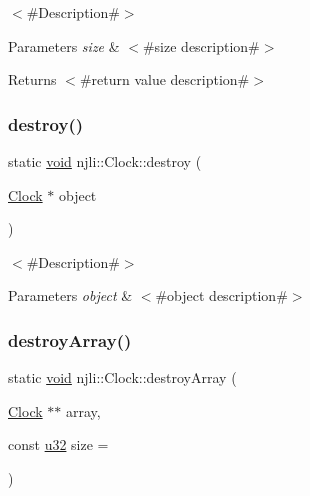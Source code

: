 $<$\#\+Description\#$>$


\begin{DoxyParams}{Parameters}
{\em size} & $<$\#size description\#$>$\\
\hline
\end{DoxyParams}
\begin{DoxyReturn}{Returns}
$<$\#return value description\#$>$ 
\end{DoxyReturn}
\mbox{\label{classnjli_1_1_clock_a4147bdb4d31e3402ba76ccd9652c50e0}} 
\subsubsection{\texorpdfstring{destroy()}{destroy()}}
{\footnotesize\ttfamily static \mbox{\hyperlink{_thread_8h_af1e856da2e658414cb2456cb6f7ebc66}{void}} njli\+::\+Clock\+::destroy (\begin{DoxyParamCaption}\item[{\mbox{\hyperlink{classnjli_1_1_clock}{Clock}} $\ast$}]{object }\end{DoxyParamCaption})\hspace{0.3cm}{\ttfamily [static]}}

$<$\#\+Description\#$>$


\begin{DoxyParams}{Parameters}
{\em object} & $<$\#object description\#$>$ \\
\hline
\end{DoxyParams}
\mbox{\label{classnjli_1_1_clock_a4d8b6dbf9cf4eae3be8bca7ac498ad2b}} 
\subsubsection{\texorpdfstring{destroy\+Array()}{destroyArray()}}
{\footnotesize\ttfamily static \mbox{\hyperlink{_thread_8h_af1e856da2e658414cb2456cb6f7ebc66}{void}} njli\+::\+Clock\+::destroy\+Array (\begin{DoxyParamCaption}\item[{\mbox{\hyperlink{classnjli_1_1_clock}{Clock}} $\ast$$\ast$}]{array,  }\item[{const \mbox{\hyperlink{_util_8h_a10e94b422ef0c20dcdec20d31a1f5049}{u32}}}]{size = {} }\end{DoxyParamCaption})\hspace{0.3cm}{\ttfamily [static]}}

